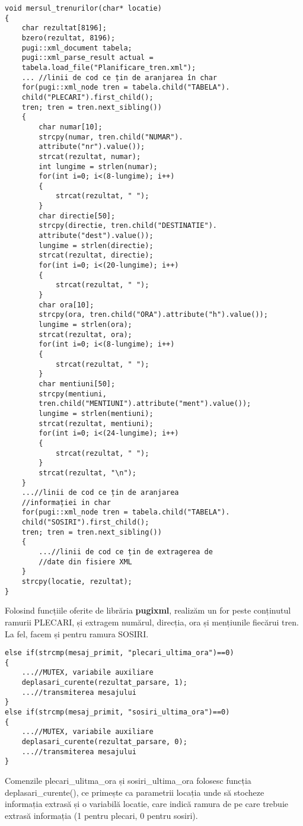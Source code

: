 \documentclass[runningheads]{llncs}
\begin{document}
\begin{verbatim}
void mersul_trenurilor(char* locatie)
{
    char rezultat[8196];
    bzero(rezultat, 8196);
    pugi::xml_document tabela;
    pugi::xml_parse_result actual =
    tabela.load_file("Planificare_tren.xml");
    ... //linii de cod ce țin de aranjarea în char
    for(pugi::xml_node tren = tabela.child("TABELA").
    child("PLECARI").first_child(); 
    tren; tren = tren.next_sibling())
    {
        char numar[10];
        strcpy(numar, tren.child("NUMAR").
        attribute("nr").value());
        strcat(rezultat, numar);
        int lungime = strlen(numar);
        for(int i=0; i<(8-lungime); i++)
        {
            strcat(rezultat, " ");
        }
        char directie[50];
        strcpy(directie, tren.child("DESTINATIE").
        attribute("dest").value());
        lungime = strlen(directie);
        strcat(rezultat, directie);
        for(int i=0; i<(20-lungime); i++)
        {
            strcat(rezultat, " ");
        }
        char ora[10];
        strcpy(ora, tren.child("ORA").attribute("h").value());
        lungime = strlen(ora);
        strcat(rezultat, ora);
        for(int i=0; i<(8-lungime); i++)
        {
            strcat(rezultat, " ");
        }
        char mentiuni[50];
        strcpy(mentiuni, 
        tren.child("MENTIUNI").attribute("ment").value());
        lungime = strlen(mentiuni);
        strcat(rezultat, mentiuni);
        for(int i=0; i<(24-lungime); i++)
        {
            strcat(rezultat, " ");
        }
        strcat(rezultat, "\n");
    }
    ...//linii de cod ce țin de aranjarea 
    //informației in char
    for(pugi::xml_node tren = tabela.child("TABELA").
    child("SOSIRI").first_child(); 
    tren; tren = tren.next_sibling())
    {
        ...//linii de cod ce țin de extragerea de 
        //date din fisiere XML
    }
    strcpy(locatie, rezultat);
}
\end{verbatim}
Folosind funcțiile oferite de librăria \textbf{pugixml}, realizăm un for peste conținutul ramurii PLECARI, și extragem numărul, direcția, ora și mențiunile fiecărui tren. La fel, facem și pentru ramura SOSIRI.

\begin{verbatim}
else if(strcmp(mesaj_primit, "plecari_ultima_ora")==0)
{
    ...//MUTEX, variabile auxiliare
    deplasari_curente(rezultat_parsare, 1);
    ...//transmiterea mesajului
}
else if(strcmp(mesaj_primit, "sosiri_ultima_ora")==0)
{
    ...//MUTEX, variabile auxiliare
    deplasari_curente(rezultat_parsare, 0);
    ...//transmiterea mesajului
}
\end{verbatim}
Comenzile plecari\_ulitma\_ora și sosiri\_ultima\_ora folosesc funcția deplasari\_curente(), ce primește ca parametrii locația unde să stocheze informația extrasă și o variabilă locatie, care indică ramura de pe care trebuie extrasă informația (1 pentru plecari, 0 pentru sosiri).
\end{document}
